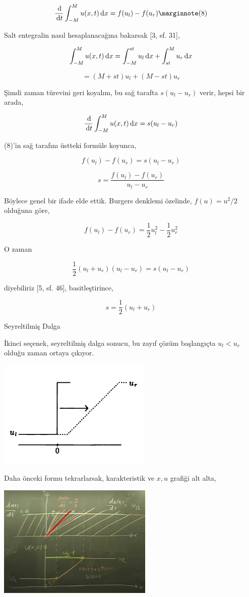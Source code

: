 \documentclass[12pt,fleqn]{article}\usepackage{../../common}
\begin{document}
$$
\frac{\ud}{\ud t} \int_{-M}^{M} u(x,t) \ud x = f(u_l) - f(u_r)
\mlabel{8}
$$

Salt entegralin nasıl hesaplanacağına bakarsak [3, sf. 31],

$$
\int_{-M}^{M} u(x,t) \,\mathrm{d} x =
\int_{-M}^{st} u_l \,\mathrm{d} x + 
\int_{st}^{M} u_r \,\mathrm{d} x
$$

$$
= (M+st)u_l + (M-st)u_r
$$

Şimdi zaman türevini geri koyalım, bu sağ tarafta $s(u_l-u_r)$ verir, hepsi
bir arada,

$$
\frac{\,\mathrm{d}}{\,\mathrm{d} t} \int_{-M}^{M} u(x,t) \,\mathrm{d} x = s(u_l-u_r)
$$

(8)'in sağ tarafını üstteki formüle koyunca,

$$
f(u_l) - f(u_r) = s(u_l-u_r)
$$

$$
s = \frac{f(u_l) - f(u_r)}{u_l-u_r}
$$

Böylece genel bir ifade elde ettik. Burgers denklemi özelinde,
$f(u) = u^2 / 2$ olduğuna göre,

$$
f(u_l) - f(u_r) = \frac{1}{2} u_l^2 -  \frac{1}{2} u_r^2
$$

O zaman

$$
\frac{1}{2} (u_l + u_r)(u_l - u_r) = s(u_l-u_r)
$$

diyebiliriz [5, sf. 46], basitleştirince,

$$
s = \frac{1}{2} (u_l + u_r)
$$

Seyreltilmiş Dalga

İkinci seçenek, seyreltilmiş dalga sonucu, bu zayıf çözüm başlangıçta
$u_l < u_r$ olduğu zaman ortaya çıkıyor.

\includegraphics[width=20em]{compscieng_bpp50fv1_02.png}

Daha önceki formu tekrarlarsak, karakteristik ve $x,u$ grafiği alt alta,

\includegraphics[width=20em]{compscieng_bpp50fv1_06.png}
\end{document}

